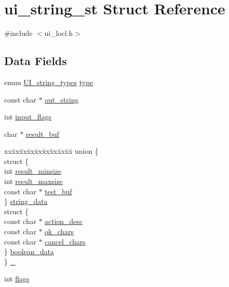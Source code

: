 \hypertarget{structui__string__st}{}\section{ui\+\_\+string\+\_\+st Struct Reference}
\label{structui__string__st}


{\ttfamily \#include $<$ui\+\_\+locl.\+h$>$}

\subsection*{Data Fields}
\begin{DoxyCompactItemize}
\item 
enum \hyperlink{crypto_2ui_2ui_8h_adad09cdb357f365974c55f6cb9f82fa7}{U\+I\+\_\+string\+\_\+types} \hyperlink{structui__string__st_a61fc5b9fd86045d42b1384fb772f83ed}{type}
\item 
const char $\ast$ \hyperlink{structui__string__st_a630b57a841a183dfee377448f5d9731e}{out\+\_\+string}
\item 
int \hyperlink{structui__string__st_ad86aeaf7d72246d3bb4676899b6ac429}{input\+\_\+flags}
\item 
char $\ast$ \hyperlink{structui__string__st_a51b77ba49a26ac054f8847f1822213eb}{result\+\_\+buf}
\item 
\begin{tabbing}
xx\=xx\=xx\=xx\=xx\=xx\=xx\=xx\=xx\=\kill
union \{\\
\>struct \{\\
\>\>int \hyperlink{structui__string__st_ae04d4a5e40ca185c8e44d49baea3b534}{result\_minsize}\\
\>\>int \hyperlink{structui__string__st_a9141bf3e5bcf80f4ab78341b83575d04}{result\_maxsize}\\
\>\>const char $\ast$ \hyperlink{structui__string__st_aa4ea77df18e1a6c8e7e05ec2eb253bc8}{test\_buf}\\
\>\} \hyperlink{structui__string__st_a2d8efc87b326ce4e7caf063de8e9bba3}{string\_data}\\
\>struct \{\\
\>\>const char $\ast$ \hyperlink{structui__string__st_aca790c66207320183c73f2ac5934aa5c}{action\_desc}\\
\>\>const char $\ast$ \hyperlink{structui__string__st_ab4db13bb971055cead22bee606302cd9}{ok\_chars}\\
\>\>const char $\ast$ \hyperlink{structui__string__st_a30d8e817b903b538bc5fdaafa87239ba}{cancel\_chars}\\
\>\} \hyperlink{structui__string__st_ae393662254d183fd0182fbf783d44b65}{boolean\_data}\\
\} \hyperlink{structui__string__st_a4a48cb933bc05132769be4806f309cbf}{\_}\\

\end{tabbing}\item 
int \hyperlink{structui__string__st_ac8bf36fe0577cba66bccda3a6f7e80a4}{flags}
\end{DoxyCompactItemize}


